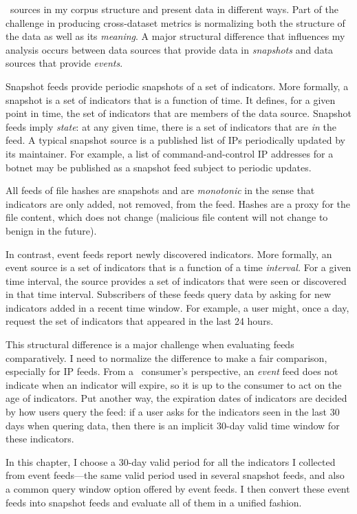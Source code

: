 \ti\ sources in my corpus structure and present data in different ways.
Part of the challenge in producing cross-dataset metrics is normalizing both
the structure of the data as well as its \emph{meaning}. A major structural
difference that influences my analysis occurs between data sources that
provide data in \emph{snapshots} and data sources that provide \emph{events}.

Snapshot feeds provide periodic snapshots of a set of indicators. More formally, a
snapshot is a set of indicators that is a function of time. It defines, for a given point in
time, the set of indicators that are members of the data source. Snapshot feeds imply
\emph{state}: at any given time, there is a set of indicators that are \emph{in} the feed.
A typical snapshot source is a published list of IPs periodically updated by its maintainer.
For example, a list of command-and-control IP addresses for a botnet may be published as a
snapshot feed subject to periodic updates.

All feeds of file hashes are snapshots and are \emph{monotonic} in the sense that indicators
are only added, not removed, from the feed. Hashes are a proxy for the file
content, which does not change (malicious file content will not change to benign in the future).

In contrast, event feeds report newly discovered indicators. More formally, an event source
is a set of indicators that is a function of a time \emph{interval.} For a given time interval,
the source provides a set of indicators that were seen or discovered in that time interval.
Subscribers of these feeds query data by asking for new indicators added in a recent time window.
For example, a user might, once a day, request the set of indicators that appeared
in the last 24 hours.

This structural difference is a major challenge when evaluating feeds comparatively.
I need to normalize the difference to make a fair comparison, especially for IP feeds. From a \ti\
consumer's perspective, an \emph{event} feed does not indicate when an indicator will
expire, so it is up to the consumer to act on the age of indicators. Put another way,
the expiration dates of indicators are decided by how users query the feed:
if a user asks for the indicators seen in the last 30 days
when quering data, then there is an implicit 30-day valid time window for these indicators.

In this chapter, I choose a 30-day valid period for all the indicators I collected from event feeds---the same valid period
used in several snapshot feeds, and also a common query window option offered by event feeds.
I then convert these event feeds into snapshot feeds and evaluate all of them in a unified fashion.


